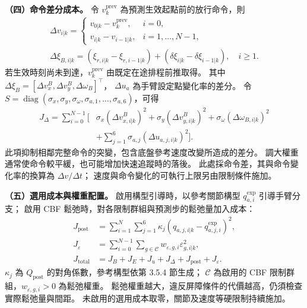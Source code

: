\noindent\textbf{（四）命令差分成本。}
令 $v_k^{\mathrm{prev}}$ 為預測生效起點前的放行命令，則
\begin{equation}
    \begin{gathered}
        \Delta v_{i|k}=
        \begin{cases}
            v_{0|k}-v_k^{\mathrm{prev}},&i=0,\\
            v_{i|k}-v_{i-1|k},&i=1,\ldots,N-1,
        \end{cases}\\
        \Delta\xi_{B,i|k}=
        (\xi_{r,i|k}-\xi_{r,i-1|k})
        +(\delta\xi_{i|k}-\delta\xi_{i-1|k}),\quad i\geq1 .
    \end{gathered}
    \label{eq:ch3_command_difference_definition}
\end{equation}
若生效時刻尚未到達，$v_k^{\mathrm{prev}}$ 由既定在途排程前推取得。
其中 $\Delta\xi_B=[\Delta v_x^B,\Delta v_y^B,\Delta\omega_B]^\top$，
$\Delta u_a$ 為手臂設定點變化率的差分。
令 $S=\operatorname{diag}(\sigma_x,\sigma_y,\sigma_\omega,
\sigma_{a,1},\ldots,\sigma_{a,6})$，可得
\begin{equation}
    \begin{aligned}
        J_\Delta=\sum_{i=0}^{N-1}\big[&
        \sigma_x(\Delta v_{x,i|k}^{B})^{2}
        +\sigma_y(\Delta v_{y,i|k}^{B})^{2}
        +\sigma_\omega(\Delta\omega_{B,i|k})^{2}\\
        &+\sum_{j=1}^{6}\sigma_{a,j}(\Delta u_{a,j,i|k})^{2}\big].
    \end{aligned}
    \label{eq:ch3_smoothness_cost_expanded}
\end{equation}
此項抑制相鄰完整命令的突變，包含底盤參考速度改變所造成的差分。
調大權重通常使命令較平緩，也可能增加快速追蹤時的落後。
此處採命令差，其與命令變化率的換算為 $\Delta v/\Delta t$；
速度與命令變化的可執行上限另由限制條件施加。

\noindent\textbf{（五）選用成本與權重配置。}
啟用構型引導時，以參考關節構型 $q_{a,i}^{\mathrm{exp}}$ 引導手臂分支；
啟用 CBF 鬆弛時，對各限制群組與預測步的鬆弛量加入成本：
\begin{equation}
    \begin{aligned}
        J_{\mathrm{post}}
        &=\sum_{i=1}^{N}\sum_{j=1}^{6}
        \kappa_j(q_{a,j,i|k}-q_{a,j,i}^{\mathrm{exp}})^2,\\
        J_\varepsilon
        &=\sum_{i=0}^{N-1}\sum_{g\in\mathcal C}
        w_{\varepsilon,g,i}\varepsilon_{g,i|k}^{2},\\
        J_{\mathrm{total}}
        &=J_B+J_E+J_u+J_\Delta+J_{\mathrm{post}}+J_\varepsilon .
    \end{aligned}
    \label{eq:ch3_optional_cost_terms}
\end{equation}
$\kappa_j$ 為 $Q_{\mathrm{post}}$ 的對角係數，參考構型依第 3.5.4 節生成；
$\mathcal C$ 為啟用的 CBF 限制群組，$w_{\varepsilon,g,i}>0$ 為鬆弛權重。
鬆弛權重越大，違反屏障條件的代價越高，仍須檢查實際鬆弛量與間距。
未啟用的選用成本取零，關節及速度等硬限制持續施加。


